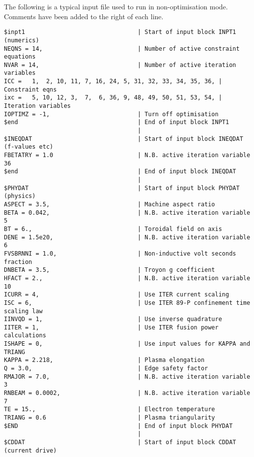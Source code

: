 \label{app:infile1}

The following is a typical input file used to run \PS in
non-optimisation mode. Comments have been added to the right of each
line.

\footnotesize
\begin{verbatim}
$inpt1                                | Start of input block INPT1 (numerics)
NEQNS = 14,                           | Number of active constraint equations
NVAR = 14,                            | Number of active iteration variables
ICC =   1,  2, 10, 11, 7, 16, 24, 5, 31, 32, 33, 34, 35, 36, | Constraint eqns
ixc =   5, 10, 12, 3,  7,  6, 36, 9, 48, 49, 50, 51, 53, 54, | Iteration variables
IOPTIMZ = -1,                         | Turn off optimisation
$end                                  | End of input block INPT1
                                      | 
$INEQDAT                              | Start of input block INEQDAT (f-values etc)
FBETATRY = 1.0                        | N.B. active iteration variable 36
$end                                  | End of input block INEQDAT
                                      | 
$PHYDAT                               | Start of input block PHYDAT (physics)
ASPECT = 3.5,                         | Machine aspect ratio
BETA = 0.042,                         | N.B. active iteration variable 5
BT = 6.,                              | Toroidal field on axis
DENE = 1.5e20,                        | N.B. active iteration variable 6
FVSBRNNI = 1.0,                       | Non-inductive volt seconds fraction
DNBETA = 3.5,                         | Troyon g coefficient
HFACT = 2.,                           | N.B. active iteration variable 10
ICURR = 4,                            | Use ITER current scaling
ISC = 6,                              | Use ITER 89-P confinement time scaling law
IINVQD = 1,                           | Use inverse quadrature
IITER = 1,                            | Use ITER fusion power calculations
ISHAPE = 0,                           | Use input values for KAPPA and TRIANG
KAPPA = 2.218,                        | Plasma elongation
Q = 3.0,                              | Edge safety factor
RMAJOR = 7.0,                         | N.B. active iteration variable 3
RNBEAM = 0.0002,                      | N.B. active iteration variable 7
TE = 15.,                             | Electron temperature
TRIANG = 0.6                          | Plasma triangularity
$END                                  | End of input block PHYDAT
                                      | 
$CDDAT                                | Start of input block CDDAT (current drive)

\end{verbatim}
